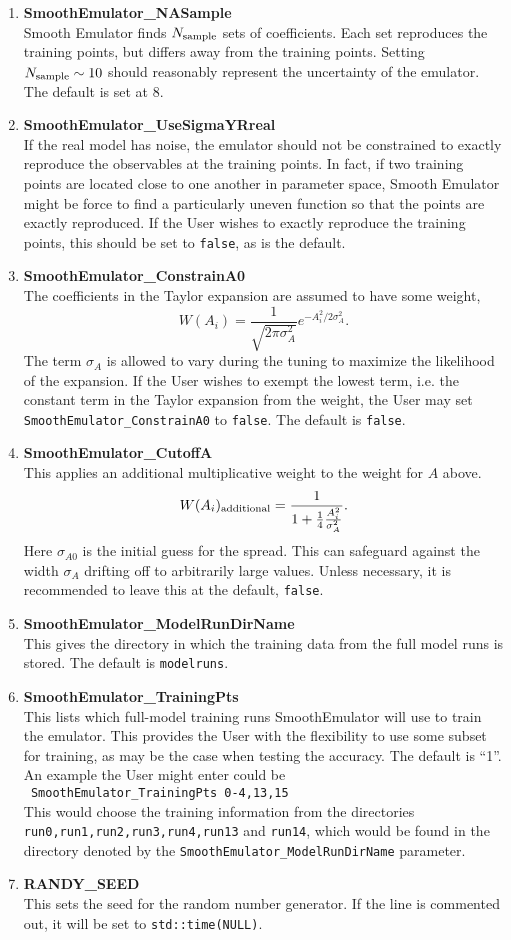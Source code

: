 \documentclass[main.tex]{subfiles}
\begin{document}
\begin{enumerate}
\item {\bf SmoothEmulator\_NASample}\\
Smooth Emulator finds $N_{\rm sample}$ sets of coefficients. Each set reproduces the training points, but differs away from the training points. Setting $N_{\rm sample}\sim 10$ should reasonably represent the uncertainty of the emulator. The default is set at 8.
\item {\bf SmoothEmulator\_UseSigmaYRreal}\\
If the real model has noise, the emulator should not be constrained to exactly reproduce the observables at the training points. In fact, if two training points are located close to one another in parameter space, Smooth Emulator might be force to find a particularly uneven function so that the points are exactly reproduced. If the User wishes to exactly reproduce the training points, this should be set to {\tt false}, as is the  default. 
\item {\bf SmoothEmulator\_ConstrainA0}\\
The coefficients in the Taylor expansion are assumed to have some weight,
\[
W(A_i)=\frac{1}{\sqrt{2\pi\sigma_A^2}}e^{-A_i^2/2\sigma_A^2}.
\]
The term $\sigma_A$ is allowed to vary during the tuning to maximize the likelihood of the expansion. If the User wishes to exempt the lowest term, i.e. the constant term in the Taylor expansion from the weight, the User may set {\tt SmoothEmulator\_ConstrainA0} to {\tt false}. The default is {\tt false}.
\item {\bf SmoothEmulator\_CutoffA}\\
This applies an additional multiplicative weight to the weight for $A$ above.
\[
W(A_i)_{\rm additional}=\frac{1}{1+\frac{1}{4}\frac{A_i^2}{\sigma_{A}^2}}.
\] 
Here $\sigma_{A0}$ is the initial guess for the spread. This can safeguard against the width $\sigma_A$ drifting off to arbitrarily large values. Unless necessary, it is recommended to leave this at the default, {\tt false}.
\item {\bf SmoothEmulator\_ModelRunDirName}\\
This gives the directory in which the training data from the full model runs is stored. The default is {\tt modelruns}.

\item {\bf SmoothEmulator\_TrainingPts}\\
This lists which full-model training runs SmoothEmulator will use to train the emulator. This provides the User with the flexibility to use some subset for training, as may be the case when testing the accuracy. The default is ``1''. An example the User might enter could be\\
{\tt ~SmoothEmulator\_TrainingPts  0-4,13,15}\\
This would choose the training information from the directories {\tt run0,run1,run2,run3,run4,run13} and {\tt run14}, which would be found in the directory denoted by the {\tt SmoothEmulator\_ModelRunDirName} parameter.
\item {\bf RANDY\_SEED}\\
This sets the seed for the random number generator. If the line is commented out, it will be set to {\tt std::time(NULL)}.


\end{enumerate}
\end{document}
